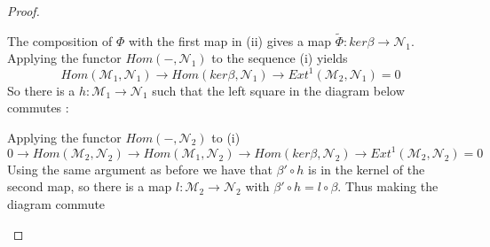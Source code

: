 \documentclass[
	oldfontcommands,
	sumario=abnt-6027-2012,
	12pt,			%
	openright,		%
	oneside,		%
	a4paper,		%
	english,		%
	brazil			%
	]{imecc-unicamp}
\begin{document}
\begin{proof}
\begin{center}
\end{center}
The composition of $\Phi$ with the first map in (ii) gives a map $\tilde{\Phi}:ker \beta \to \mathcal{N}_1$. Applying the functor $Hom(-,\mathcal{N}_1)$ to the sequence (i) yields
\begin{equation}
Hom(\mathcal{M}_1,\mathcal{N}_1) \to Hom(ker \beta, \mathcal{N}_1) \to Ext^1(\mathcal{M}_2,\mathcal{N}_1)=0
\end{equation}
So there is a $h : \mathcal{M}_1 \to \mathcal{N}_1$ such that the left square in the diagram below commutes :
\begin{center}
\end{center}
Applying the functor $Hom(-,\mathcal{N}_2)$ to (i)
\begin{equation}
0 \to Hom(\mathcal{M}_2, \mathcal{N}_2) \to Hom(\mathcal{M}_1,\mathcal{N}_2) \to Hom(ker \beta, \mathcal{N}_2) \to Ext^1(\mathcal{M}_2, \mathcal{N}_2) = 0
\end{equation}
Using the same argument as before we have that $\beta ' \circ h$ is in the kernel of the second map, so there is a map $l : \mathcal{M}_2 \to \mathcal{N}_2$ with $\beta ' \circ h = l \circ \beta$. Thus making the diagram commute
\begin{center}

\end{center}
\end{proof}
\end{document}
